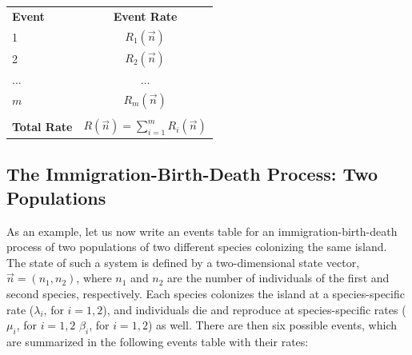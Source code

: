 \documentclass{article}
\begin{document}
\begin{center}
	\begin{tabular}{lc}
		\textbf{Event} & \textbf{Event Rate} \\
		
		1          & $R_1(\vec{n})$ \\
		2          & $R_2(\vec{n})$ \\
		$\dots$    & $\dots$        \\
		$m$        & $R_m(\vec{n})$ \\
		           &                \\
		\textbf{Total Rate} & $R(\vec{n}) = \sum_{i=1}^m R_i(\vec{n})$
	\end{tabular}
\end{center}

\subsection{The Immigration-Birth-Death Process: Two Populations}
As an example, let us now write an events table for an immigration-birth-death process of two populations of two different species colonizing the same island. The state of such a system is defined by a two-dimensional state vector, $\vec{n} = (n_1, n_2)$, where $n_1$ and $n_2$ are the number of individuals of the first and second species, respectively. Each species colonizes the island at a species-specific rate ($\lambda_i$, for $i=1,2$), and individuals die and reproduce at species-specific rates ($\mu_i$, for $i=1,2$ $\beta_i$, for $i=1,2$) as well. There are then six possible events, which are summarized in the following events table with their rates:
\end{document}
